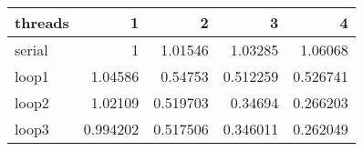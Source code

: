 \begin{tabular}{lrrrr}
\hline
 threads   &        1 &        2 &        3 &        4 \\
\hline
 serial    & 1        & 1.01546  & 1.03285  & 1.06068  \\
 loop1     & 1.04586  & 0.54753  & 0.512259 & 0.526741 \\
 loop2     & 1.02109  & 0.519703 & 0.34694  & 0.266203 \\
 loop3     & 0.994202 & 0.517506 & 0.346011 & 0.262049 \\
\hline
\end{tabular}
